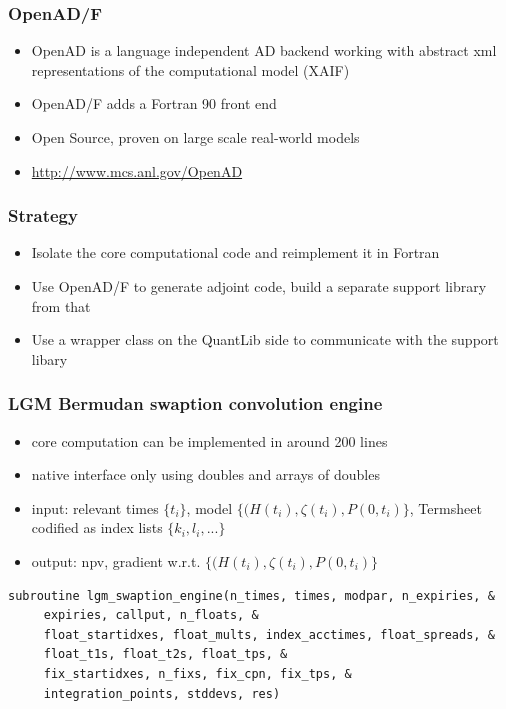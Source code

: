 \documentclass{beamer}
\begin{document}
\begin{frame}[fragile]
\frametitle{OpenAD/F}
\begin{itemize}
\item OpenAD is a language independent AD backend working with abstract xml representations of the computational model (XAIF)
\item OpenAD/F adds a Fortran 90 front end
\item Open Source, proven on large scale real-world models
\item \url{http://www.mcs.anl.gov/OpenAD}
\end{itemize}
\end{frame}

\begin{frame}[fragile]
\frametitle{Strategy}
\begin{itemize}
\item Isolate the core computational code and reimplement it in Fortran
\item Use OpenAD/F to generate adjoint code, build a separate support library from that
\item Use a wrapper class on the QuantLib side to communicate with the support libary
\end{itemize}
\end{frame}

\begin{frame}[fragile]
\frametitle{LGM Bermudan swaption convolution engine}
\begin{itemize}
\item core computation can be implemented in around 200 lines
\item native interface only using doubles and arrays of doubles
\item input: relevant times $\{t_i\}$, model $\{(H(t_i), \zeta(t_i), P(0,t_i)\}$,
Termsheet codified as index lists $\{k_i, l_i, ...\}$
\item output: npv, gradient w.r.t. $\{(H(t_i), \zeta(t_i), P(0,t_i)\}$
\end{itemize}
\begin{verbatim}
subroutine lgm_swaption_engine(n_times, times, modpar, n_expiries, &
     expiries, callput, n_floats, &
     float_startidxes, float_mults, index_acctimes, float_spreads, &
     float_t1s, float_t2s, float_tps, &
     fix_startidxes, n_fixs, fix_cpn, fix_tps, &
     integration_points, stddevs, res)
\end{verbatim}
\end{frame}
\end{document}
